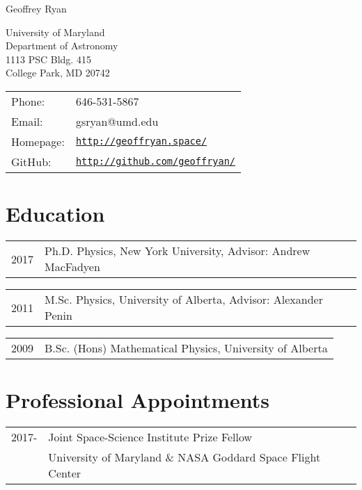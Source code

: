 \documentclass[letterpaper]{article}
\def\name{Geoffrey Ryan}
\renewenvironment{itemize}{
  \begin{list}{}{
    \setlength{\leftmargin}{1.5em}
  }
}{
  \end{list}
}
\begin{document}
{\huge \name}


\vspace{0.25in}

\begin{minipage}{0.45\linewidth}
  University of Maryland \\
  Department of Astronomy\\
  1113 PSC Bldg. 415\\
  College Park, MD 20742
\end{minipage}
\begin{minipage}{0.45\linewidth}
  \begin{tabular}{ll}
    Phone: & 646-531-5867 \\
    Email: &  gsryan@umd.edu \\
    Homepage: & \href{http://geoffryan.space/}{\tt http://geoffryan.space/} \\
    GitHub: & \href{http://github.com/geoffryan/}{\tt http://github.com/geoffryan/} \\
  \end{tabular}
\end{minipage}

\section*{Education}
\begin{itemize}
\item \begin{tabular}{ll}
2017 & Ph.D. Physics, New York University, Advisor: Andrew MacFadyen \\
\end{tabular}

\item \begin{tabular}{ll}
2011 &  M.Sc. Physics, University of Alberta, Advisor: Alexander Penin \\
\end{tabular}

\item \begin{tabular}{ll}
2009 &  B.Sc. (Hons) Mathematical Physics, University of Alberta \\
\end{tabular}
\end{itemize}

\section*{Professional Appointments} %
\begin{itemize}
\item \begin{tabular}{ll}
2017- & Joint Space-Science Institute Prize Fellow \\
	 & University of Maryland  \& NASA Goddard Space Flight Center\\
\end{tabular}
\end{itemize}
\end{document}
